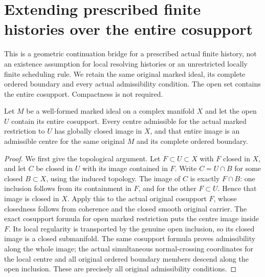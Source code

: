 \section{Extending prescribed finite histories over the entire cosupport}
\label{sec:open-cosupport-history-extension}
This is a geometric continuation bridge for a prescribed actual finite history,
not an existence assumption for local resolving histories or an unrestricted
locally finite scheduling rule.  We retain the same original marked ideal,
its complete ordered boundary and every actual admissibility condition.  The
open set contains the entire cosupport.  Compactness is not required.

\begin{lemma}
\label{hir:open-cosupport-global-centre}
\leanok
Let $M$ be a well-formed marked ideal on a complex manifold $X$ and let the open
$U$ contain its entire cosupport.  Every centre admissible for the actual marked
restriction to $U$ has globally closed image in $X$, and that entire image is an
admissible centre for the same original $M$ and its complete ordered boundary.
\end{lemma}
\begin{proof}
We first give the topological argument.  Let $F\subset U\subset X$ with $F$
closed in $X$, and let $C$ be closed in $U$ with its image contained in $F$.
Write $C=U\cap B$ for some closed $B\subset X$, using the induced topology.
The image of $C$ is exactly $F\cap B$: one inclusion follows from its containment
in $F$, and for the other $F\subset U$.  Hence that image is closed in $X$.
Apply this to the actual original cosupport $F$, whose closedness follows from
coherence and the closed smooth original carrier.  The exact cosupport formula
for open marked restriction puts the centre image inside $F$.  Its local
regularity is transported by the genuine open inclusion, so its closed image is
a closed submanifold.  The same cosupport formula proves admissibility along the
whole image; the actual simultaneous normal-crossing coordinates for the local
centre and all original ordered boundary members descend along the open
inclusion.  These are precisely all original admissibility conditions.
\end{proof}

